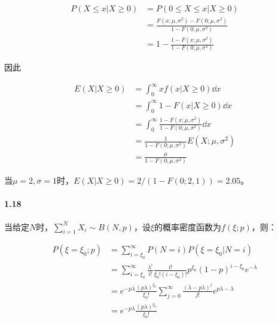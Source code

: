 \documentclass{article}
\begin{document}
    \begin{equation}
        \begin{aligned}
            P(X\leq x | X\geq 0) &= P(0\leq X\leq x | X\geq 0) \\
            &= \frac{F(x; \mu, \sigma^2) - F(0; \mu, \sigma^2)}{1 - F(0; \mu, \sigma^2)} \\
            &= 1 - \frac{1 - F(x; \mu, \sigma^2)}{1 - F(0; \mu, \sigma^2)}
        \end{aligned}
    \end{equation}

    因此

    \begin{equation}
        \begin{aligned}
            E(X | X\geq 0) &= \int _0 ^\infty xf(x | X\geq 0)\dd x \\
            &= \int_0^\infty 1 - F(x | X\geq 0)\dd x \\
            &= \int_0^\infty \frac{1 - F(x; \mu, \sigma^2)}{1 - F(0; \mu, \sigma^2)} \dd x \\
            &= \frac{1}{1 - F(0; \mu, \sigma^2)}E(X; \mu, \sigma^2) \\
            &= \frac{\mu}{1 - F(0; \mu, \sigma^2)}
        \end{aligned}
    \end{equation}

    当$\mu = 2, \sigma = 1$时，$E(X|X\geq 0) = 2 / (1 - F(0; 2, 1)) = 2.05$。

    \paragraph*{1.18}

    当给定$N$时，$\sum_{i=1}^NX_i \sim B(N, p)$，设$\xi$的概率密度函数为$f(\xi; p)$，则：

    \begin{equation}
        \begin{aligned}
            P(\xi = \xi_0; p) &= \sum_{i=\xi_0}^\infty P(N = i)P(\xi = \xi_0 | N = i) \\
            &= \sum_{i=\xi_0}^\infty \frac{\lambda ^i}{i!}\frac{i!}{\xi_0!(i - \xi_0)!}p^{\xi_0}(1-p)^{i - \xi_0}e^{-\lambda} \\
            &= e^{-p\lambda}\frac{(p\lambda)^{\xi_0}}{\xi_0!}\sum_{j=0}^\infty \frac{(\lambda-p\lambda)^{j}}{j!}e^{p\lambda-\lambda} \\
            &= e^{-p\lambda}\frac{(p\lambda)^{\xi_0}}{\xi_0!}
        \end{aligned}
    \end{equation}
\end{document}

